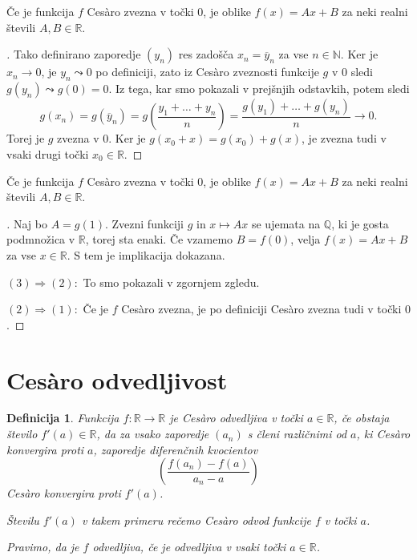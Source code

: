 \documentclass{beamer}
\newtheorem{definicija}{Definicija}
\newenvironment{dokaz}{\begin{proof}[\bfseries\upshape\proofname]}{\end{proof}}
\begin{document}
\begin{frame}
    \begin{block}{}
        Če je funkcija $f$ Ces\`{a}ro zvezna v točki $0$, je oblike $f(x) = Ax + B$ za neki realni števili $A, B \in \mathbb{R}$.
    \end{block}
    \begin{dokaz}\renewcommand{\qedsymbol}{}
        Tako definirano zaporedje $(y_n)$ res zadošča $x_n = \overline{y}_n$ za vse $n \in \mathbb{N}$. Ker je $x_n \rightarrow 0$, je $y_n \leadsto 0$ po definiciji, zato iz Ces\`{a}ro zveznosti funkcije $g$ v $0$ sledi $g(y_n) \leadsto g(0) = 0$. Iz tega, kar smo pokazali v prejšnjih odstavkih, potem sledi 
        $$g(x_n) = g(\overline{y}_n) = g(\frac{y_1 + \ldots + y_n}{n}) = \frac{g(y_1) + \ldots + g(y_n)}{n} \rightarrow 0.$$
        Torej je $g$ zvezna v $0$. Ker je $g(x_0 + x) = g(x_0) + g(x)$, je zvezna tudi v vsaki drugi točki $x_0 \in \mathbb{R}$.
    \end{dokaz}
\end{frame}

\begin{frame}
    \begin{block}{}
        Če je funkcija $f$ Ces\`{a}ro zvezna v točki $0$, je oblike $f(x) = Ax + B$ za neki realni števili $A, B \in \mathbb{R}$.
    \end{block}
    \begin{dokaz}
        Naj bo $A = g(1)$. Zvezni funkciji $g$ in $x \mapsto Ax$ se ujemata na $\mathbb{Q}$, ki je gosta podmnožica v $\mathbb{R}$, torej sta enaki. Če vzamemo $B = f(0)$, velja $f(x) = Ax + B$ za vse $x \in \mathbb{R}$. S tem je implikacija dokazana.
        \pause

        \medskip
        $(3) \Rightarrow (2): $ To smo pokazali v zgornjem zgledu.
        \pause

        \medskip
        $(2) \Rightarrow (1): $ Če je $f$ Ces\`{a}ro zvezna, je po definiciji Ces\`{a}ro zvezna tudi v točki $0$.
    \end{dokaz}
\end{frame}


\section{Ces\`{a}ro odvedljivost}

\begin{frame}
    \begin{definicija}
        Funkcija $f: \mathbb{R} \rightarrow \mathbb{R}$ je Ces\`{a}ro odvedljiva v točki $a \in \mathbb{R}$, če obstaja število $f'(a) \in \mathbb{R}$, da za vsako zaporedje $(a_n)$ s členi različnimi od $a$, ki Ces\`{a}ro konvergira proti $a$, zaporedje diferenčnih kvocientov 
        $$(\frac{f(a_n)-f(a)}{a_n-a})$$ 
        Ces\`{a}ro konvergira proti $f'(a)$. 
        \pause

        \medskip
        Številu $f'(a)$ v takem primeru rečemo Ces\`{a}ro odvod funkcije $f$ v točki $a$. 
        \pause

        \medskip
        Pravimo, da je $f$ odvedljiva, če je odvedljiva v vsaki točki $a \in \mathbb{R}$.
    \end{definicija}
\end{frame}
\end{document}
